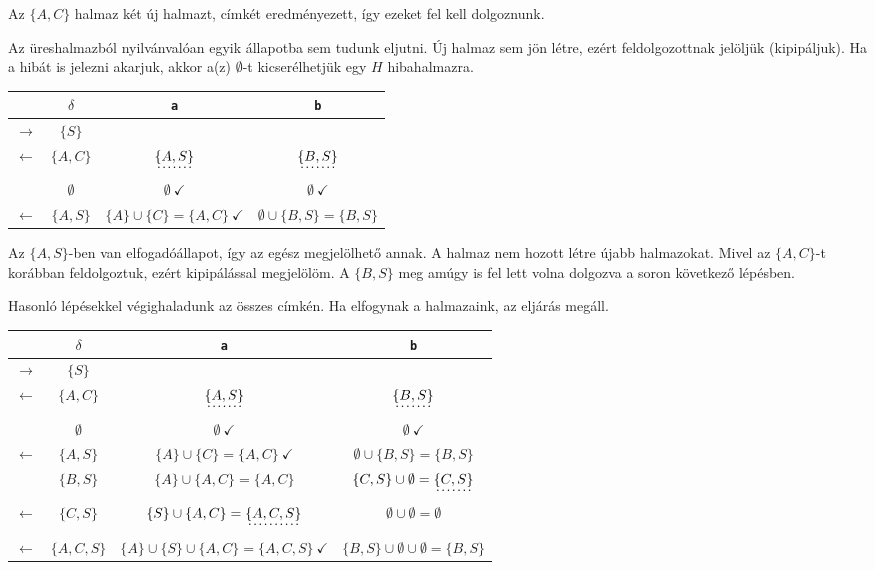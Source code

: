 \documentclass[a4paper,11pt]{article}
\begin{document}
Az $\{A,C\}$ halmaz két új halmazt, címkét eredményezett, így ezeket fel kell dolgoznunk.

Az üreshalmazból nyilvánvalóan egyik állapotba sem tudunk eljutni. Új halmaz sem jön létre, ezért feldolgozottnak jelöljük (kipipáljuk). Ha a hibát is jelezni akarjuk, akkor a(z) $\emptyset$-t kicserélhetjük egy $H$ hibahalmazra.

\begin{center}
	\setlength{\tabcolsep}{0.5em} %
	{\renewcommand{\arraystretch}{1.5}%
		\begin{tabular}{cc||c|c}
			& $\delta$ & \texttt{a} & \texttt{b} \\
			\hline
			$\rightarrow$ & $\{S\}$ & \dotuline{$\{A, C\}$} & \dotuline{$\emptyset$ } \\
			\hline
			$\leftarrow$ & $\{A, C\}$ & $\dotuline{\{A, S\}}$ & $\dotuline{\{ B,S \}}$ \\
			\hline
			& $ \emptyset$ & $\emptyset ~ \checkmark$ & $\emptyset ~ \checkmark$ \\
			\hline
			$\leftarrow$ & $\{A,S\}$ & $\{A\} \cup \{C\} = \{A,C\} ~ \checkmark$ & $\emptyset \cup \{B,S\} = \{B,S\}$
		\end{tabular}
	}
\end{center}

Az $\{A,S\}$-ben van elfogadóállapot, így az egész megjelölhető annak. A halmaz nem hozott létre újabb halmazokat. Mivel az $\{A,C\}$-t korábban feldolgoztuk, ezért kipipálással megjelölöm. A $\{B,S\}$ meg amúgy is fel lett volna dolgozva a soron következő lépésben.

Hasonló lépésekkel végighaladunk az összes címkén. Ha elfogynak a halmazaink, az eljárás megáll.

\begin{center}
	\setlength{\tabcolsep}{0.5em} %
	{\renewcommand{\arraystretch}{1.5}%
		\begin{tabular}{cc||c|c}
			& $\delta$ & \texttt{a} & \texttt{b} \\
			\hline
			$\rightarrow$ & $\{S\}$ & \dotuline{$\{A, C\}$} & \dotuline{$\emptyset$ } \\
			\hline
			$\leftarrow$ & $\{A, C\}$ & $\dotuline{\{A, S\}}$ & $\dotuline{\{ B,S \}}$ \\
			\hline
			& $ \emptyset$ & $\emptyset ~ \checkmark$ & $\emptyset ~ \checkmark$ \\
			\hline
			$\leftarrow$ & $\{A,S\}$ & $\{A\} \cup \{C\} = \{A,C\} ~ \checkmark$ & $\emptyset \cup \{B,S\} = \{B,S\}$ \\
			\hline
			& $\{B,S\}$ & $\{A\} \cup \{A,C\} = \{A,C\}$ & $\{C,S\} \cup \emptyset = \dotuline{\{C,S\}}$ \\
			\hline
			$\leftarrow$ & $\{C,S\}$ & $\{S\} \cup \{A,C\} = \dotuline{\{A,C,S\}}$ & $\emptyset \cup \emptyset = \emptyset$ \\
			\hline
			$\leftarrow$ & $\{A,C,S\}$ & $\{A\} \cup \{S\} \cup \{A,C\} = \{A,C,S\} ~ \checkmark$ & $\{B,S\} \cup \emptyset \cup \emptyset = \{B,S\}$
		\end{tabular}
	}
\end{center}
\end{document}
